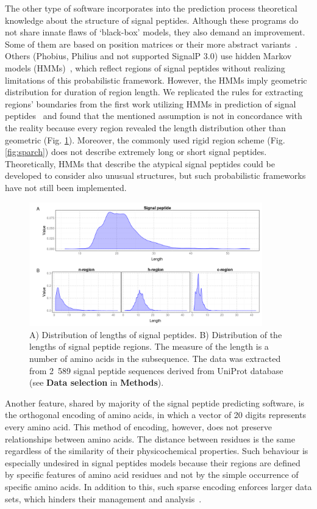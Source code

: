 \documentclass[fleqn,10pt,twoside]{gcb15submission}
\begin{document}
The other type of software incorporates into the prediction process theoretical knowledge about the structure of signal peptides. Although these programs do not share innate flaws of ‘black-box’ models, they also demand an improvement. Some of them are based on position matrices or their more abstract variants~\citep{2014zhangprediction, 2004hillerpredisi}. Others (Phobius, Philius and not supported SignalP 3.0) use hidden Markov models (HMMs)~\citep{2004klla, 2008reynoldstransmembrane, 2004bendtsenimproved}, which reflect regions of signal peptides without realizing limitations of this probabilistic framework. However, the HMMs imply geometric distribution for duration of region length. We replicated the rules for extracting regions' boundaries from the first work utilizing HMMs in prediction of signal peptides~\citep{1998nielsenprediction} and found that the mentioned assumption is not in concordance with the reality because every region revealed the length distribution other than geometric (Fig. \ref{fig:reglen}). Moreover, the commonly used rigid region scheme (Fig. \ref{fig:sparch}) does not describe extremely long or short signal peptides. Theoretically, HMMs that describe the atypical signal peptides could be developed to consider also unusual structures, but such probabilistic frameworks have not still been implemented.

\begin{figure}[ht]\centering
\includegraphics[width=0.9\textwidth]{figures/reglen.png}
\caption{A) Distribution of lengths of signal peptides. B) Distribution of the lengths of signal peptide regions. The measure of the length is a number of amino acids in the subsequence. The data was extracted from 2~589 signal peptide sequences derived from UniProt database (see \textbf{Data selection} in \textbf{Methods}).}
\label{fig:reglen}
\end{figure}


Another feature, shared by majority of the signal peptide predicting software, is the orthogonal encoding of amino acids, in which a vector of 20 digits represents every amino acid. This method of encoding, however, does not preserve relationships between amino acids. The distance between residues is the same regardless of the similarity of their physicochemical properties. Such behaviour is especially undesired in signal peptides models because their regions are defined by specific features of amino acid residues and not by the simple occurrence of specific amino acids. In addition to this, such sparse encoding enforces larger data sets, which hinders their management and analysis~\citep{2002linamino}.
\end{document}
